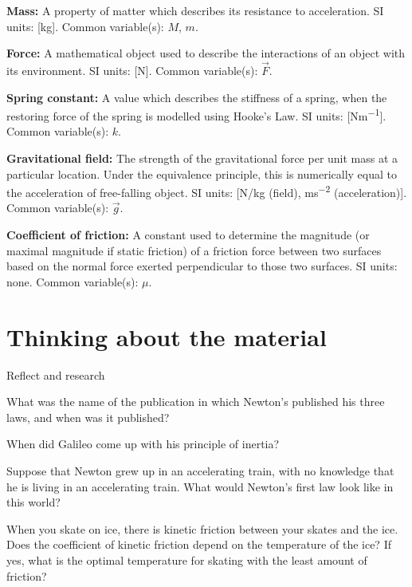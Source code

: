 \begin{definitions}
	\textbf{Mass:} A property of matter which describes its resistance to acceleration. SI units: [\si{kg}]. Common variable(s): $M$, $m$.
	\item \textbf{Force:} A mathematical object used to describe the interactions of an object with its environment. SI units: [\si{N}]. Common variable(s): $\vec F$.
	\item \textbf{Spring constant:} A value which describes the stiffness of a spring, when the restoring force of the spring is modelled using Hooke's Law. SI units: [\si{Nm^{-1}}]. Common variable(s): $k$.
	\item \textbf{Gravitational field:} The strength of the gravitational force per unit mass at a particular location. Under the equivalence principle, this is numerically equal to the acceleration of free-falling object. SI units: [\si{N/kg} (field), \si{ms^{-2}} (acceleration)]. Common variable(s): $\vec g$.
	\item \textbf{Coefficient of friction:} A constant used to determine the magnitude (or maximal magnitude if static friction) of a friction force between two surfaces based on the normal force exerted perpendicular to those two surfaces. SI units: none. Common variable(s): $\mu$.
\end{definitions}

\newpage

\section{Thinking about the material}
\begin{chapteractivity}{Reflect and research}
{
\item What was the name of the publication in which Newton's published his three laws, and when was it published?
\item When did Galileo come up with his principle of inertia?
\item Suppose that Newton grew up in an accelerating train, with no knowledge that he is living in an accelerating train. What would Newton's first law look like in this world?
\item When you skate on ice, there is kinetic friction between your skates and the ice. Does the coefficient of kinetic friction depend on the temperature of the ice? If yes, what is the optimal temperature for skating with the least amount of friction?
}
\end{chapteractivity}

